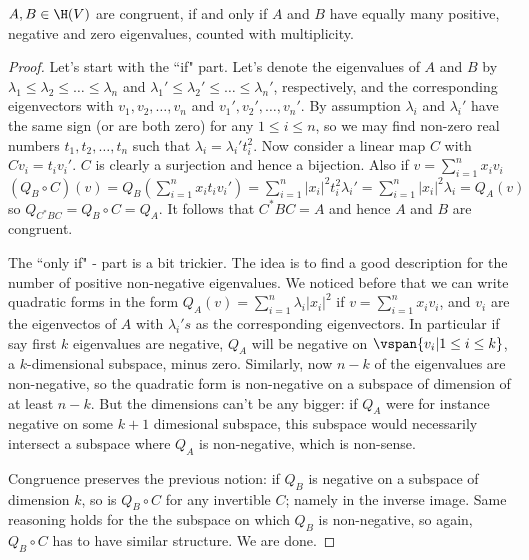 \begin{lause}
	$A, B \in \H(V)$ are congruent, if and only if $A$ and $B$ have equally many positive, negative and zero eigenvalues, counted with multiplicity.
\end{lause}
\begin{proof}
	Let's start with the ``if" part. Let's denote the eigenvalues of $A$ and $B$ by $\lambda_{1} \leq \lambda _{2} \leq \ldots \leq \lambda_{n}$ and $\lambda_{1}' \leq \lambda _{2}' \leq \ldots \leq \lambda_{n}'$, respectively, and the corresponding eigenvectors with $v_{1}, v_{2}, \ldots, v_{n}$ and $v_{1}', v_{2}', \ldots, v_{n}'$. By assumption $\lambda_{i}$ and $\lambda_{i}'$ have the same sign (or are both zero) for any $1 \leq i \leq n$, so we may find non-zero real numbers $t_{1}, t_{2}, \ldots, t_{n}$ such that $\lambda_{i} = \lambda_{i}' t_{i}^{2}$. Now consider a linear map $C$ with $C v_{i} = t_{i} v_{i}'$. $C$ is clearly a surjection and hence a bijection. Also if $v = \sum_{i = 1}^{n} x_{i} v_{i}$ $(Q_{B} \circ C)(v) = Q_{B}(\sum_{i = 1}^{n} x_{i} t_{i} v_{i}') = \sum_{i = 1}^{n} |x_{i}|^{2} t_{i}^2 \lambda_{i}' = \sum_{i = 1}^{n} |x_{i}|^{2} \lambda_{i} = Q_{A}(v)$ so $Q_{C^{*}BC} = Q_{B} \circ C = Q_{A}$. It follows that $C^{*}BC = A$ and hence $A$ and $B$ are congruent.

	The ``only if" - part is a bit trickier. The idea is to find a good description for the number of positive non-negative eigenvalues. We noticed before that we can write quadratic forms in the form $Q_{A}(v) = \sum_{i = 1}^{n} \lambda_{i} |x_{i}|^{2}$ if $v = \sum_{i = 1}^{n} x_{i}v_{i}$, and $v_{i}$ are the eigenvectos of $A$ with $\lambda_{i}'s$ as the corresponding eigenvectors. In particular if say first $k$ eigenvalues are negative, $Q_{A}$ will be negative on $\vspan\{v_{i} | 1 \leq i \leq k\}$, a $k$-dimensional subspace, minus zero. Similarly, now $n - k$ of the eigenvalues are non-negative, so the quadratic form is non-negative on a subspace of dimension of at least $n - k$. But the dimensions can't be any bigger: if $Q_{A}$ were for instance negative on some $k + 1$ dimesional subspace, this subspace would necessarily intersect a subspace where $Q_{A}$ is non-negative, which is non-sense.

	Congruence preserves the previous notion: if $Q_{B}$ is negative on a subspace of dimension $k$, so is $Q_{B} \circ C$ for any invertible $C$; namely in the inverse image. Same reasoning holds for the the subspace on which $Q_{B}$ is non-negative, so again, $Q_{B} \circ C$ has to have similar structure. We are done.
\end{proof}

